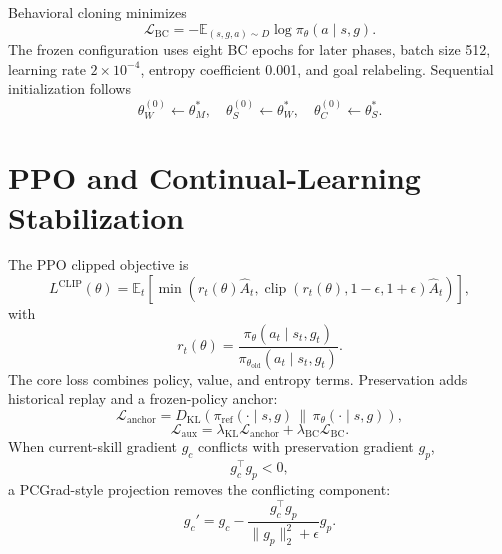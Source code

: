 \documentclass[11pt]{article}
\newcommand{\E}{\mathbb{E}}
\newcommand{\KL}{D_{\mathrm{KL}}}
\begin{document}
Behavioral cloning minimizes
\begin{equation}
\mathcal L_{\mathrm{BC}}=-\E_{(s,g,a)\sim D}\log\pi_\theta(a\mid s,g).
\end{equation}
The frozen configuration uses eight BC epochs for later phases, batch size 512, learning rate $2\times10^{-4}$, entropy coefficient 0.001, and goal relabeling. Sequential initialization follows
\begin{equation}
\theta_W^{(0)}\leftarrow\theta_M^*,\quad
\theta_S^{(0)}\leftarrow\theta_W^*,\quad
\theta_C^{(0)}\leftarrow\theta_S^*.
\end{equation}

\section{PPO and Continual-Learning Stabilization}
The PPO clipped objective is \citep{schulman2017ppo}
\begin{equation}
L^{\mathrm{CLIP}}(\theta)=\E_t\left[\min\left(r_t(\theta)\hat A_t,\operatorname{clip}(r_t(\theta),1-\epsilon,1+\epsilon)\hat A_t\right)\right],
\end{equation}
with
\begin{equation}
r_t(\theta)=\frac{\pi_\theta(a_t\mid s_t,g_t)}{\pi_{\theta_{\mathrm{old}}}(a_t\mid s_t,g_t)}.
\end{equation}
The core loss combines policy, value, and entropy terms. Preservation adds historical replay and a frozen-policy anchor:
\begin{equation}
\mathcal L_{\mathrm{anchor}}=\KL\!\left(\pi_{\mathrm{ref}}(\cdot\mid s,g)\,\|\,\pi_\theta(\cdot\mid s,g)\right),
\end{equation}
\begin{equation}
\mathcal L_{\mathrm{aux}}=\lambda_{\mathrm{KL}}\mathcal L_{\mathrm{anchor}}+\lambda_{\mathrm{BC}}\mathcal L_{\mathrm{BC}}.
\end{equation}
When current-skill gradient $g_c$ conflicts with preservation gradient $g_p$,
\begin{equation}
g_c^\top g_p<0,
\end{equation}
a PCGrad-style projection removes the conflicting component:
\begin{equation}
g_c' = g_c-\frac{g_c^\top g_p}{\|g_p\|_2^2+\epsilon}g_p.
\end{equation}
\end{document}
